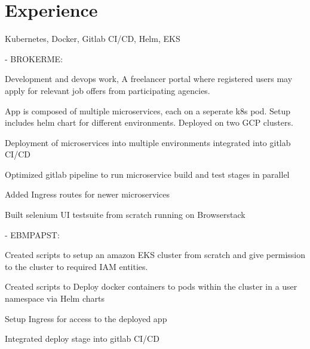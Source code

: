 \documentclass[]{font}
\begin{document}
\begin{minipage}[t]{0.66\textwidth} 


\section{Experience}

Kubernetes, Docker, Gitlab CI/CD, Helm, EKS
\vspace{\topsep}
\begin{tightemize}
\item  - BROKERME:
\item Development and devops work, A freelancer portal where registered users may apply for relevant job offers from participating agencies.
\item App is composed of multiple microservices, each on a seperate k8s pod. Setup includes helm chart for different environments. Deployed on two GCP clusters.
\item Deployment of microservices into multiple environments integrated into gitlab CI/CD
\item Optimized gitlab pipeline to run microservice build and test stages in parallel
\item Added Ingress routes for newer microservices
\item Built selenium UI testsuite from scratch running on Browserstack
\item  - EBMPAPST:
\item Created scripts to setup an amazon EKS cluster from scratch and give permission to the cluster to required IAM entities.
\item Created scripts to Deploy docker containers to pods within the cluster in a user namespace via Helm charts
\item Setup Ingress for access to the deployed app 
\item Integrated deploy stage into gitlab CI/CD
\end{tightemize}
\sectionsep


\end{minipage}
\end{document}
